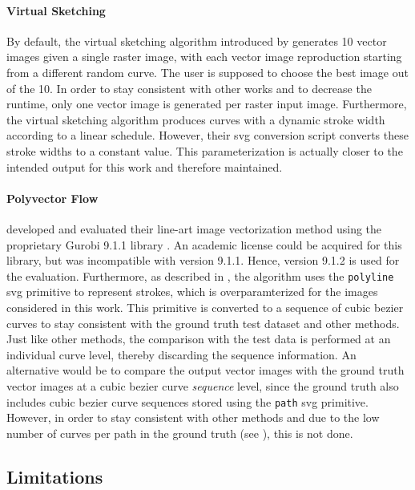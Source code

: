 \paragraph{Virtual Sketching \citep{mo2021virtualsketching}}
By default, the virtual sketching algorithm introduced by \citet{mo2021virtualsketching} generates 10 vector images given a single raster image, with each vector image reproduction starting from a different random curve. The user is supposed to choose the best image out of the 10. In order to stay consistent with other works and to decrease the runtime, only one vector image is generated per raster input image. Furthermore, 
the virtual sketching algorithm produces curves with a dynamic stroke width according to a linear schedule. However, their \gls{svg} conversion script converts these stroke widths to a constant value. This parameterization is actually closer to the intended output for this work and therefore maintained.

\paragraph{Polyvector Flow \citep{Puhachov2021KeypointPolyvector}}
\label{p:eval.setup.prior.poly}
\citet{Puhachov2021KeypointPolyvector} developed and evaluated their line-art image vectorization method using the proprietary Gurobi 9.1.1 library \citep{gurobi}. An academic license could be acquired for this library, but was incompatible with version 9.1.1. Hence, version 9.1.2 is used for the evaluation. Furthermore, as described in , the algorithm uses the \texttt{polyline} \gls{svg} primitive to represent strokes, which is overparamterized for the images considered in this work. This primitive is converted to a sequence of cubic bezier curves to stay consistent with the ground truth test dataset and other methods. Just like other methods, the comparison with the test data is performed at an individual curve level, thereby discarding the sequence information. An alternative would be to compare the output vector images with the ground truth vector images at a cubic bezier curve \emph{sequence} level, since the ground truth also includes cubic bezier curve sequences stored using the \texttt{path} \gls{svg} primitive. However, in order to stay consistent with other methods and due to the low number of curves per path in the ground truth (see ), this is not done.


\subsection{Limitations}
\label{subsec:eval.limitations}


